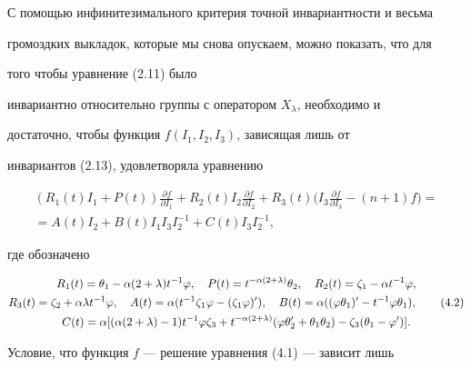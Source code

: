С помощью инфинитезимального критерия точной инвариантности и весьма


громоздких выкладок, которые мы снова опускаем, можно показать, что для


того чтобы уравнение (2.11) было


инвариантно относительно группы с оператором $X_\lambda$, необходимо и


достаточно, чтобы функция $f(I_1,I_2,I_3)$, зависящая лишь от


инвариантов (2.13), удовлетворяла уравнению


\begin{multline}


(R_1(t)I_1+P(t))


\frac{\partial f}{\partial I_1}+R_2(t)I_2


\frac{\partial f}{\partial I_2}+R_3(t)\biggl( I_3


\frac{\partial f}{\partial I_3}-(n+1)f\biggr)=\\


=A(t)I_2+B(t)I_1I_3I^{-1}_2+C(t)I_3I^{-1}_2, \tag{4.1}


\end{multline}


где обозначено


\begin{gather}


R_1(t)=\theta_1-\alpha(2+\lambda)t^{-1}\varphi,\quad


P(t)=t^{-\alpha(2+\lambda)}\theta_2,\quad


R_2(t)=\zeta_1-\alpha t^{-1}\varphi,\notag \\


R_3(t)=\zeta_2+\alpha\lambda t^{-1}\varphi,\quad


A(t)=\alpha(t^{-1}\zeta_1\varphi-(\zeta_1\varphi)'),\quad


B(t)=\alpha((\varphi\theta_1)'-t^{-1}\varphi\theta_1),\tag{4.2}\\


C(t)=\alpha[(\alpha(2+\lambda)-1)t^{-1}\varphi\zeta_3+


t^{-\alpha(2+\lambda)}(\varphi\theta'_2+\theta_1\theta_2)-


\zeta_3(\theta_1-\varphi')].\notag


\end{gather}





Условие, что функция $f$ --- решение уравнения (4.1) --- зависит лишь


